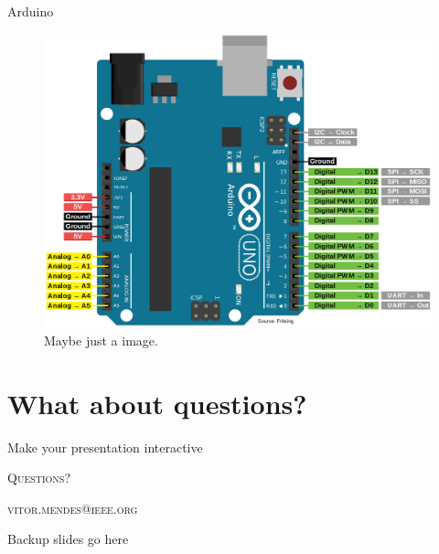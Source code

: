\documentclass{cubeamer}
\begin{document}
\begin{frame}{Arduino}

    \begin{figure}
        \centering
        \includegraphics[height = 0.5\textheight]{img/uno.png}
        \caption{Maybe just a image.}
    \end{figure}

\end{frame}

\section{What about questions?}

\begin{frame}{Make your presentation interactive}
    \begin{cublock}
        \begin{overlayarea}{\textwidth}{\baselineskip}
        \end{overlayarea}
    \end{cublock}
\end{frame}

\begin{frame}[standout]
    \Huge\textsc{Questions?}
    
    \vfill
    
    \LARGE\textsc{vitor.mendes@ieee.org}
\end{frame}

\appendix

\begin{frame}{Backup slides go here}
    
\end{frame}
\end{document}
